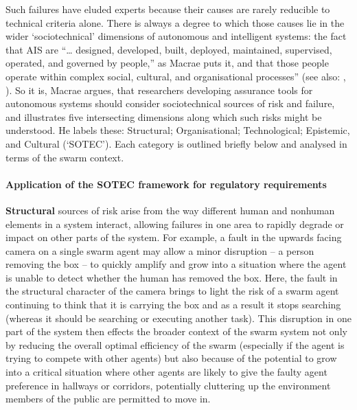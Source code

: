 \documentclass[lettersize,journal]{IEEEtran}
\begin{document}
Such failures have eluded experts because their causes are rarely reducible to technical criteria alone. There is always a degree to which those causes lie in the wider `sociotechnical’ dimensions of autonomous and intelligent systems: the fact that AIS are ``… designed, developed, built, deployed, maintained, supervised, operated, and governed by people,” as Macrae \cite{macrae2021learning} puts it, and that those people operate within complex social, cultural, and organisational processes” (see also: \cite{pettersen2021organizational}, \cite{reason2016managing}). So it is, Macrae \cite{macrae2021learning} argues, that researchers developing assurance tools for autonomous systems should consider sociotechnical sources of risk and failure, and illustrates five intersecting dimensions along which such risks might be understood. He labels these: Structural; Organisational; Technological; Epistemic, and Cultural (‘SOTEC’). Each category is outlined briefly below and  analysed in terms of the swarm context.
\\
\paragraph*{Application of the SOTEC framework for regulatory requirements}
\textbf{Structural} sources of risk arise from the way different human and nonhuman elements in a system interact, allowing failures in one area to rapidly degrade or impact on other parts of the system. For example, a fault in the upwards facing camera on a single swarm agent may allow a minor disruption – a person removing the box – to quickly amplify and grow into a situation where the agent is unable to detect whether the human has removed the box. Here, the fault in the structural character of the camera brings to light the risk of a swarm agent continuing to think that it is carrying the box and as a result it stops searching (whereas it should be searching or executing another task). This disruption in one part of the system then effects the broader context of the swarm system not only by reducing the overall optimal efficiency of the swarm (especially if the agent is trying to compete with other agents) but also because of the potential to grow into a critical situation where other agents are likely to give the faulty agent preference in hallways or corridors, potentially cluttering up the environment members of the public are permitted to move in. 
\end{document}
